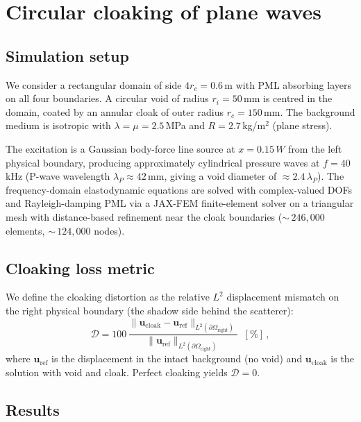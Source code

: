 \documentclass{article}
\newcommand{\mbf}[1]{\mathbf{#1}}
\newcommand{\be}{\begin{equation}}
\newcommand{\ee}{\end{equation}}
\begin{document}
\section{Circular cloaking of plane waves}

\subsection{Simulation setup}

We consider a rectangular domain of side $4r_c = 0.6$\,m with
PML absorbing layers on all four boundaries.
A circular void of radius $r_i = 50$\,mm is centred in the domain,
coated by an annular cloak of outer radius $r_c = 150$\,mm.
The background medium is isotropic with
$\lambda = \mu = 2.5$\,MPa and $R = 2.7$\,kg/m$^2$ (plane stress).

The excitation is a Gaussian body-force line source at
$x = 0.15\,W$ from the left physical boundary, producing
approximately cylindrical pressure waves at $f = 40$\,kHz
(P-wave wavelength $\lambda_P \approx 42$\,mm, giving a void
diameter of $\approx 2.4\,\lambda_P$).
The frequency-domain elastodynamic equations are solved with
complex-valued DOFs and Rayleigh-damping PML via a JAX-FEM
finite-element solver on a triangular mesh with distance-based
refinement near the cloak boundaries
(${\sim}\,246{,}000$ elements, ${\sim}\,124{,}000$ nodes).

\subsection{Cloaking loss metric}

We define the cloaking distortion as the relative $L^2$ displacement
mismatch on the right physical boundary (the shadow side behind the
scatterer):
\be\label{eq:distortion}
  \mathcal{D}
  = 100\,\frac{\|\mbf{u}_{\mathrm{cloak}} - \mbf{u}_{\mathrm{ref}}\|_{L^2(\partial\Omega_{\mathrm{right}})}}
              {\|\mbf{u}_{\mathrm{ref}}\|_{L^2(\partial\Omega_{\mathrm{right}})}}\;\;[\%]\,,
\ee
where $\mbf{u}_{\mathrm{ref}}$ is the displacement in the intact
background (no void) and $\mbf{u}_{\mathrm{cloak}}$ is the solution
with void and cloak.
Perfect cloaking yields $\mathcal{D} = 0$.

\subsection{Results}
\end{document}
